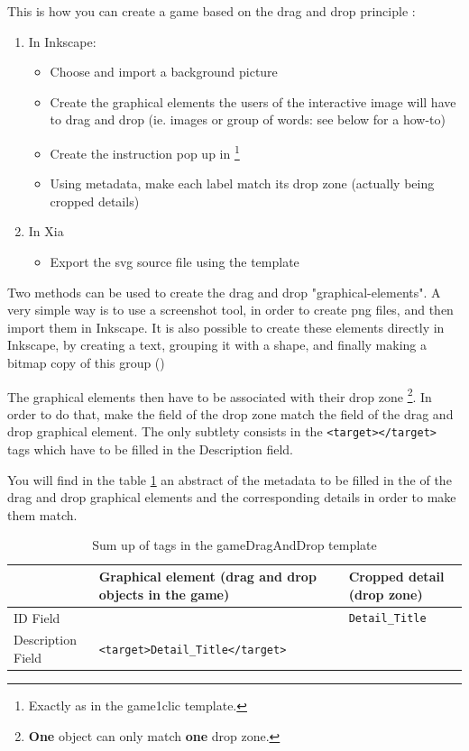 This is how you can create a game based on the drag and drop principle :
\begin{enumerate}
 \item In Inkscape:
\begin{itemize}
 \item Choose and import a background picture
 \item Create the graphical elements the users of the interactive image will have to drag and drop (ie. images or group of words: see below for a how-to)
 \item Create the instruction pop up in \footnote{Exactly as in the game1clic template.}
 \item Using metadata, make each label match its drop zone (actually being cropped details)
\end{itemize}
 \item In Xia
 \begin{itemize}
  \item Export the svg source file using the  template
 \end{itemize}
\end{enumerate}

Two methods can be used to create the drag and drop "graphical-elements".
A very simple way is to use a screenshot tool, in order to create png files, and then import them in Inkscape.
It is also possible to create these elements directly in Inkscape, by creating a text, grouping it with a shape,
and finally making a bitmap copy of this group ()


The graphical elements then have to be associated with their drop zone \footnote{\textbf{One} object
can only match \textbf{one} drop zone.}. In order to do that, make the  field of the drop zone match
the  field of the drag and drop graphical element. 
The only subtlety consists in the  \verb|<target></target>| tags which have to be filled in the \softmenu
{Description} field.

You will find in the table \ref{tag2_sumup} an abstract of the metadata to be filled in the  
of the drag and drop graphical elements and the corresponding details in order to make them match.

\begin{table}
\begin{tabular}{|p{}|p{2.5in}|p{1.5in}|}
\hline
 & Graphical element (drag and drop objects in the game) & Cropped detail (drop zone)\\
\hline
ID Field & & \verb|Detail_Title|\\
\hline
Description Field & \verb|<target>Detail_Title</target>| & \\
\hline
\end{tabular}
\caption{Sum up of tags in the gameDragAndDrop template}
\label{tag2_sumup}
\end{table}


